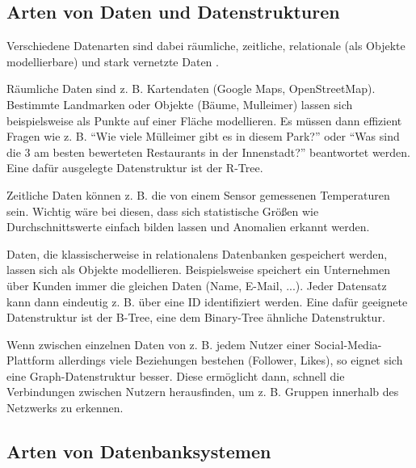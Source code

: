 \documentclass[11pt,a4paper]{article}
\begin{document}
\subsection{Arten von Daten und Datenstrukturen}

Verschiedene Datenarten sind dabei räumliche, zeitliche, relationale
(als Objekte modellierbare) und stark vernetzte Daten
\cite{no_sql_wikipedia} \cite{indian_overview}.

\vspace*{0.3cm}

Räumliche Daten sind z. B. Kartendaten (Google Maps, OpenStreetMap). Bestimmte Landmarken oder Objekte
(Bäume, Mulleimer) lassen sich beispielsweise als Punkte auf einer Fläche modellieren.
Es müssen dann effizient Fragen wie z. B. ``Wie viele Mülleimer gibt es in diesem Park?'' oder ``Was sind
die 3 am besten bewerteten Restaurants in der Innenstadt?'' beantwortet werden.
Eine dafür ausgelegte Datenstruktur ist der R-Tree.

\vspace*{0.3cm}

Zeitliche Daten können z. B. die von einem Sensor gemessenen Temperaturen sein.
Wichtig wäre bei diesen, dass sich statistische Größen wie Durchschnittswerte einfach
bilden lassen und Anomalien erkannt werden.

\vspace*{0.3cm}

Daten, die klassischerweise in relationalens Datenbanken gespeichert werden,
lassen sich als Objekte modellieren.
Beispielsweise speichert ein Unternehmen über Kunden immer die gleichen Daten
(Name, E-Mail, ...). Jeder Datensatz kann dann eindeutig z. B. über eine
ID identifiziert werden. Eine dafür geeignete Datenstruktur ist der B-Tree, eine
dem Binary-Tree ähnliche Datenstruktur.

\vspace*{0.3cm}

Wenn zwischen einzelnen Daten von z. B. jedem Nutzer einer Social-Media-Plattform
allerdings viele Beziehungen bestehen (Follower, Likes), so eignet sich eine
Graph-Datenstruktur besser. Diese ermöglicht dann, schnell die Verbindungen
zwischen Nutzern herausfinden, um z. B. Gruppen innerhalb des Netzwerks zu erkennen.

\subsection{Arten von Datenbanksystemen}
\end{document}
